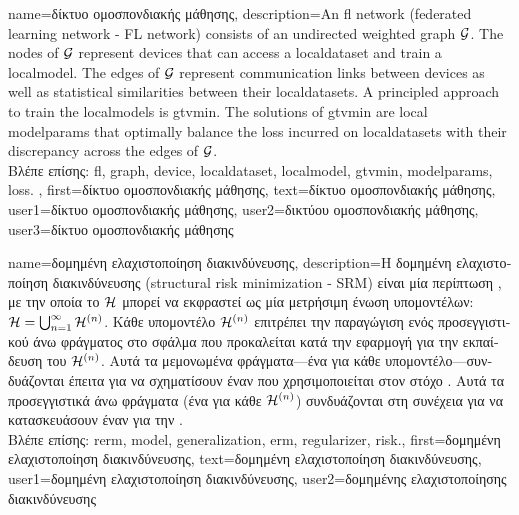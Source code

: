 {name={\foreignlanguage{greek}{δίκτυο ομοσπονδιακής μάθησης}},
	description={An \gls{fl} network 
		(federated learning network - FL network) consists of 
		an undirected weighted \gls{graph} $\mathcal{G}$. The nodes of $\mathcal{G}$ represent \gls{device}s 
		that can access a \gls{localdataset} and train a \gls{localmodel}. The edges of $\mathcal{G}$ represent 
		communication links between \gls{device}s as well as statistical similarities between their \gls{localdataset}s. 
		A principled approach to train the \gls{localmodel}s is \gls{gtvmin}. The solutions of \gls{gtvmin} are local 
		\gls{modelparams} that optimally balance the \gls{loss} incurred on \gls{localdataset}s with their discrepancy 
		across the edges of $\mathcal{G}$. \\
	    	\foreignlanguage{greek}{Βλέπε επίσης:} \gls{fl}, \gls{graph}, \gls{device}, \gls{localdataset}, \gls{localmodel}, \gls{gtvmin},
		\gls{modelparams}, \gls{loss}. },
	  first={\foreignlanguage{greek}{δίκτυο ομοσπονδιακής μάθησης}},
	  text={\foreignlanguage{greek}{δίκτυο ομοσπονδιακής μάθησης}},
	  user1={\foreignlanguage{greek}{δίκτυο ομοσπονδιακής μάθησης}}, %
  	  user2={\foreignlanguage{greek}{δικτύου ομοσπονδιακής μάθησης}}, %
	  user3={\foreignlanguage{greek}{δίκτυο ομοσπονδιακής μάθησης}} %
}

{name={\foreignlanguage{greek}{δομημένη ελαχιστοποίηση διακινδύνευσης}}, 
	description={\foreignlanguage{greek}{Η δομημένη ελαχιστοποί\-ηση διακινδύνευσης} 
		(structural risk minimization - SRM) \foreignlanguage{greek}{είναι μία περίπτωση} 
		, \foreignlanguage{greek}{με την οποία το}  $\mathcal{H}$ \foreignlanguage{greek}{μπορεί  
		να εκφραστεί ως μία μετρήσιμη ένωση υπομοντέλων: $\mathcal{H} = \bigcup_{n=1}^{\infty} \mathcal{H}^{(n)}$. 
		Κάθε υπομοντέλο $\mathcal{H}^{(n)}$ επιτρέπει την παραγώγιση ενός προσεγγιστικού άνω φράγματος στο σφάλμα}  
		 \foreignlanguage{greek}{που προκαλείται κατά την εφαρμογή}  
		\foreignlanguage{greek}{για την εκπαίδευση του $\mathcal{H}^{(n)}$. 
		Αυτά τα μεμονωμένα φράγματα—ένα για κάθε υπομοντέλο—συνδυάζονται έπειτα για να σχηματίσουν έναν}  
		\foreignlanguage{greek}{που χρησιμοποιείται στον στόχο} . 
        		\foreignlanguage{greek}{Αυτά τα προσεγγιστικά άνω φράγματα (ένα για κάθε $\mathcal{H}^{(n)}$) συνδυάζονται στη συνέχεια 
		για να κατασκευάσουν έναν}  \foreignlanguage{greek}{για την}  \cite[Sec.\ 7.2]{ShalevMLBook}.\\
		\foreignlanguage{greek}{Βλέπε επίσης:} \gls{rerm}, \gls{model}, \gls{generalization}, \gls{erm}, \gls{regularizer}, \gls{risk}.},
	first={\foreignlanguage{greek}{δομημένη ελαχιστοποίηση διακινδύνευσης}},
	text={\foreignlanguage{greek}{δομημένη ελαχιστοποίηση διακινδύνευσης}},
	user1={\foreignlanguage{greek}{δομημένη ελαχιστοποίηση διακινδύνευσης}}, %
  	user2={\foreignlanguage{greek}{δομημένης ελαχιστοποίησης διακινδύνευσης}} %
 }

